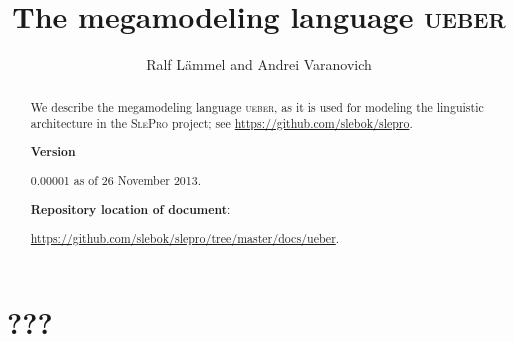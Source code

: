 \documentclass[preprint,authoryear,12pt]{noelsarticle}
\newcommand{\slepro}{\textsc{SlePro}}
\newcommand{\ueber}{\textsc{ueber}}
\begin{document}
\begin{frontmatter}

\title{The megamodeling language \ueber}

\author{Ralf L\"ammel and Andrei Varanovich}

\address{Software Languages Team\\University of Koblenz-Landau, Germany}

\begin{abstract}
  We describe the megamodeling language \ueber, as it is used for
  modeling the linguistic architecture in the \slepro{} project; see
  \url{https://github.com/slebok/slepro}.

\bigskip

\begin{comment}
\noindent
\textbf{Acknowledgement}: {\small This document and the underlying
  development are parts of a broader effort on language modeling and
  software language engineering---joint work with \emph{Anya Helene
    Bagge}, University of Bergen. Helpful interaction with and
  feedback by Andrei Varanovich, University of Koblenz-Landau, is also
  gratefully acknowledged.}
\end{comment}

\medskip

\noindent
\textbf{Version}

0.00001 as of 26 November 2013.

\medskip

\noindent
\textbf{Repository location of document}: 

\url{https://github.com/slebok/slepro/tree/master/docs/ueber}.
\end{abstract}

\end{frontmatter}

\pagebreak


\tableofcontents

\pagebreak


\section{???}


{\small

%
%
%

}

\end{document}

